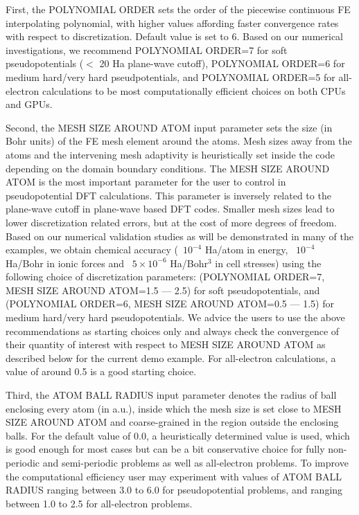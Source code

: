 \begin{enumerate}
First, the POLYNOMIAL ORDER sets the order of the piecewise continuous FE interpolating polynomial, with higher values affording faster convergence rates with respect to discretization. Default value is set to 6. Based on our numerical investigations, we recommend POLYNOMIAL ORDER=7 for soft pseudopotentials ($<$ 20 Ha plane-wave cutoff), POLYNOMIAL ORDER=6 for medium hard/very hard pseudpotentials, and POLYNOMIAL ORDER=5 for all-electron calculations to be most computationally efficient choices on both CPUs and GPUs.

Second, the MESH SIZE AROUND ATOM input parameter sets the size (in Bohr units) of the FE mesh element around the atoms. Mesh sizes away from the atoms and the intervening mesh adaptivity is heuristically set inside the code depending on the domain boundary conditions. The MESH SIZE AROUND ATOM is the most important parameter for the user to control in pseudopotential DFT calculations. This parameter is inversely related to the plane-wave cutoff in plane-wave based DFT codes. Smaller mesh sizes lead to lower discretization related errors, but at the cost of more degrees of freedom. Based on our numerical validation studies as will be demonstrated in many of the examples, we obtain chemical accuracy (~$10^{-4}$ Ha/atom in energy, ~$10^{-4}$ Ha/Bohr in ionic forces and ~$5 \times 10^{-6}$ Ha/Bohr$^3$ in cell stresses) using the following choice of discretization parameters: (POLYNOMIAL ORDER=7, MESH SIZE AROUND ATOM=1.5 --- 2.5) for soft pseudopotentials, and (POLYNOMIAL ORDER=6, MESH SIZE AROUND ATOM=0.5 --- 1.5) for medium hard/very hard pseudopotentials. We advice the users to use the above recommendations as starting choices only and always check the convergence of their quantity of interest with respect to MESH SIZE AROUND ATOM as described below for the current demo example. For all-electron calculations, a value of around 0.5 is a good starting choice. %

Third, the ATOM BALL RADIUS input parameter denotes the radius of ball enclosing every atom (in a.u.), inside which the mesh size is set close to MESH SIZE AROUND ATOM and coarse-grained in the region outside the enclosing balls. For the default value of 0.0, a heuristically determined value is used, which is good enough for most cases but can be a bit conservative choice for fully non-periodic and semi-periodic problems as well as all-electron problems. To improve the computational efficiency user may experiment with values of ATOM BALL RADIUS ranging between 3.0 to 6.0 for pseudopotential problems, and ranging between 1.0 to 2.5 for all-electron problems.


\end{enumerate}

